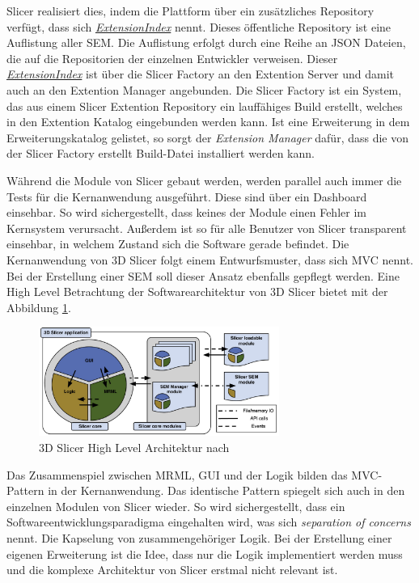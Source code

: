 Slicer realisiert dies, indem die Plattform über ein zusätzliches Repository
verfügt, dass sich \href{https://github.com/Slicer/ExtensionsIndex?tab=readme-ov-file}{\textit{ExtensionIndex}}
nennt. Dieses öffentliche Repository ist eine Auflistung aller \ac{SEM}. Die
Auflistung erfolgt durch eine Reihe an \ac{JSON} Dateien, die auf die
Repositorien der einzelnen Entwickler verweisen. Dieser \href{https://github.com/Slicer/ExtensionsIndex?tab=readme-ov-file}{\textit{ExtensionIndex}}
ist über die Slicer Factory an den Extention Server und damit auch an den Extention
Manager angebunden. Die Slicer Factory ist ein System, das aus einem Slicer Extention
Repository ein lauffähiges Build erstellt, welches in den Extention Katalog
eingebunden werden kann. Ist eine Erweiterung in dem Erweiterungskatalog gelistet,
so sorgt der \textit{Extension Manager} dafür, dass die von der Slicer Factory
erstellt Build-Datei installiert werden kann.

Während die Module von Slicer gebaut werden, werden parallel auch immer die Tests
für die Kernanwendung ausgeführt. Diese sind über ein Dashboard einsehbar. So wird
sichergestellt, dass keines der Module einen Fehler im Kernsystem verursacht. Außerdem
ist so für alle Benutzer von Slicer transparent einsehbar, in welchem Zustand
sich die Software gerade befindet. Die Kernanwendung von 3D Slicer folgt einem Entwurfsmuster,
dass sich \ac{MVC} nennt. Bei der Erstellung einer \ac{SEM} soll dieser Ansatz ebenfalls
gepflegt werden. Eine High Level Betrachtung der Softwarearchitektur von 3D
Slicer bietet \cite[S.~1332]{fedorov2012slicer} mit der Abbildung
\ref{fig:3d_slicer_architektur}.

\begin{figure}[h]
	\centering
	\includegraphics[width=0.7\textwidth]{img/3d_slicer_architektur.jpg}
	\caption{3D Slicer High Level Architektur nach \citet[S.~1332]{fedorov2012slicer}}
	\label{fig:3d_slicer_architektur}
\end{figure}

Das Zusammenspiel zwischen \ac{MRML}, \ac{GUI} und der Logik bilden das MVC-Pattern
in der Kernanwendung. Das identische Pattern spiegelt sich auch in den einzelnen
Modulen von Slicer wieder. So wird sichergestellt, dass ein Softwareentwicklungsparadigma
eingehalten wird, was sich \textit{separation of concerns} nennt. Die Kapselung
von zusammengehöriger Logik. Bei der Erstellung einer eigenen Erweiterung ist die
Idee, dass nur die Logik implementiert werden muss und die komplexe Architektur
von Slicer erstmal nicht relevant ist.

